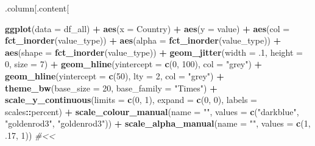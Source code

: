 \documentclass[]{book}
\newenvironment{Shaded}{\begin{snugshade}}{\end{snugshade}}
\newcommand{\KeywordTok}[1]{\textcolor[rgb]{0.13,0.29,0.53}{\textbf{#1}}}
\newcommand{\DataTypeTok}[1]{\textcolor[rgb]{0.13,0.29,0.53}{#1}}
\newcommand{\DecValTok}[1]{\textcolor[rgb]{0.00,0.00,0.81}{#1}}
\newcommand{\StringTok}[1]{\textcolor[rgb]{0.31,0.60,0.02}{#1}}
\newcommand{\CommentTok}[1]{\textcolor[rgb]{0.56,0.35,0.01}{\textit{#1}}}
\newcommand{\OperatorTok}[1]{\textcolor[rgb]{0.81,0.36,0.00}{\textbf{#1}}}
\newcommand{\NormalTok}[1]{#1}
\theoremstyle{definition}
\theoremstyle{definition}
\theoremstyle{definition}
\theoremstyle{remark}
\begin{document}
.column{[}.content{[}

\begin{Shaded}
\begin{Highlighting}[]
\KeywordTok{ggplot}\NormalTok{(}\DataTypeTok{data =}\NormalTok{ df_all) }\OperatorTok{+}
\StringTok{  }\KeywordTok{aes}\NormalTok{(}\DataTypeTok{x =}\NormalTok{ Country) }\OperatorTok{+}
\StringTok{  }\KeywordTok{aes}\NormalTok{(}\DataTypeTok{y =}\NormalTok{ value) }\OperatorTok{+}
\StringTok{  }\KeywordTok{aes}\NormalTok{(}\DataTypeTok{col =} \KeywordTok{fct_inorder}\NormalTok{(value_type)) }\OperatorTok{+}
\StringTok{  }\KeywordTok{aes}\NormalTok{(}\DataTypeTok{alpha =} \KeywordTok{fct_inorder}\NormalTok{(value_type)) }\OperatorTok{+}
\StringTok{  }\KeywordTok{aes}\NormalTok{(}\DataTypeTok{shape =} \KeywordTok{fct_inorder}\NormalTok{(value_type)) }\OperatorTok{+}
\StringTok{  }\KeywordTok{geom_jitter}\NormalTok{(}\DataTypeTok{width =}\NormalTok{ .}\DecValTok{1}\NormalTok{, }\DataTypeTok{height =} \DecValTok{0}\NormalTok{, }\DataTypeTok{size =} \DecValTok{7}\NormalTok{) }\OperatorTok{+}
\StringTok{  }\KeywordTok{geom_hline}\NormalTok{(}\DataTypeTok{yintercept =} \KeywordTok{c}\NormalTok{(}\DecValTok{0}\NormalTok{, }\DecValTok{100}\NormalTok{), }\DataTypeTok{col =} \StringTok{"grey"}\NormalTok{) }\OperatorTok{+}
\StringTok{  }\KeywordTok{geom_hline}\NormalTok{(}\DataTypeTok{yintercept =} \KeywordTok{c}\NormalTok{(}\DecValTok{50}\NormalTok{), }\DataTypeTok{lty =} \DecValTok{2}\NormalTok{, }\DataTypeTok{col =} \StringTok{"grey"}\NormalTok{) }\OperatorTok{+}
\StringTok{  }\KeywordTok{theme_bw}\NormalTok{(}\DataTypeTok{base_size =} \DecValTok{20}\NormalTok{, }\DataTypeTok{base_family =} \StringTok{"Times"}\NormalTok{) }\OperatorTok{+}
\StringTok{  }\KeywordTok{scale_y_continuous}\NormalTok{(}\DataTypeTok{limits =} \KeywordTok{c}\NormalTok{(}\DecValTok{0}\NormalTok{, }\DecValTok{1}\NormalTok{), }\DataTypeTok{expand =} \KeywordTok{c}\NormalTok{(}\DecValTok{0}\NormalTok{, }\DecValTok{0}\NormalTok{), }\DataTypeTok{labels =}\NormalTok{ scales}\OperatorTok{::}\NormalTok{percent) }\OperatorTok{+}
\StringTok{  }\KeywordTok{scale_colour_manual}\NormalTok{(}\DataTypeTok{name =} \StringTok{""}\NormalTok{, }\DataTypeTok{values =} \KeywordTok{c}\NormalTok{(}\StringTok{"darkblue"}\NormalTok{, }\StringTok{"goldenrod3"}\NormalTok{, }\StringTok{"goldenrod3"}\NormalTok{)) }\OperatorTok{+}
\StringTok{  }\KeywordTok{scale_alpha_manual}\NormalTok{(}\DataTypeTok{name =} \StringTok{""}\NormalTok{, }\DataTypeTok{values =} \KeywordTok{c}\NormalTok{(}\DecValTok{1}\NormalTok{, .}\DecValTok{17}\NormalTok{, }\DecValTok{1}\NormalTok{))  }\CommentTok{#<<}
\end{Highlighting}
\end{Shaded}
\end{document}
